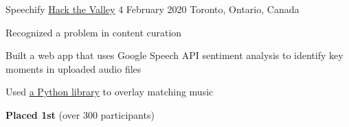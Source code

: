
\begin{cventries}

  \cventry
    {Speechify} %
    {\href{https://hackthevalley.io/}{Hack the Valley} 4} %
    {February 2020} %
    {Toronto, Ontario, Canada} %
    {
      \begin{cvitems} %
        \item{Recognized a problem in content curation}
        \item{Built a web app that uses Google Speech API sentiment analysis to identify key moments in uploaded audio files}
        \item{Used \href{https://pypi.org/project/pydub/}{a Python library} to overlay matching music}
        \item {\textbf{Placed 1st} (over 300 participants)}
      \end{cvitems}
    }


\end{cventries}
